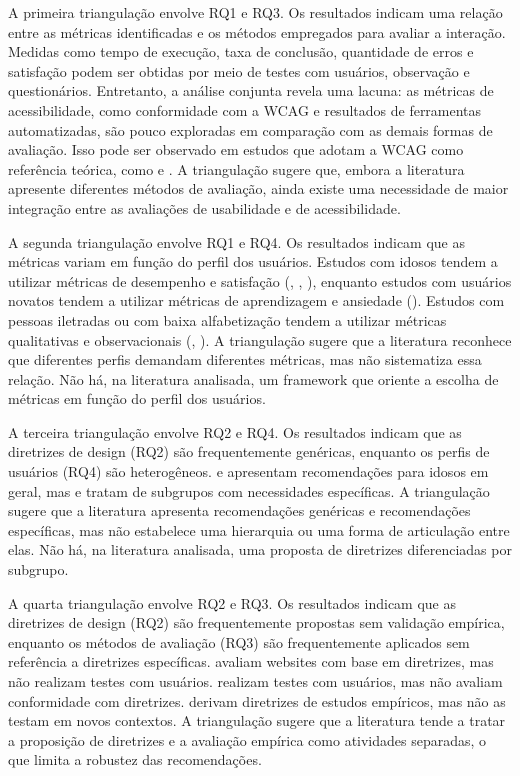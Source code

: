 A primeira triangulação envolve RQ1 e RQ3. Os resultados indicam uma relação entre as métricas identificadas e os métodos empregados para avaliar a interação. Medidas como tempo de execução, taxa de conclusão, quantidade de erros e satisfação podem ser obtidas por meio de testes com usuários, observação e questionários. Entretanto, a análise conjunta revela uma lacuna: as métricas de acessibilidade, como conformidade com a WCAG e resultados de ferramentas automatizadas, são pouco exploradas em comparação com as demais formas de avaliação. Isso pode ser observado em estudos que adotam a WCAG como referência teórica, como \cite{gonzalez2025augmenting} e \cite{wickramathilaka2023addressing}. A triangulação sugere que, embora a literatura apresente diferentes métodos de avaliação, ainda existe uma necessidade de maior integração entre as avaliações de usabilidade e de acessibilidade.

A segunda triangulação envolve RQ1 e RQ4. Os resultados indicam que as métricas variam em função do perfil dos usuários. Estudos com idosos tendem a utilizar métricas de desempenho e satisfação (\cite{weighted_heuristic}, \cite{gatsou2017seniors}, \cite{xie2010usability}), enquanto estudos com usuários novatos tendem a utilizar métricas de aprendizagem e ansiedade (\cite{cowan2011exploring}). Estudos com pessoas iletradas ou com baixa alfabetização tendem a utilizar métricas qualitativas e observacionais (\cite{filgueiras2009recoverability}, \cite{barron2013feasibility}). A triangulação sugere que a literatura reconhece que diferentes perfis demandam diferentes métricas, mas não sistematiza essa relação. Não há, na literatura analisada, um framework que oriente a escolha de métricas em função do perfil dos usuários.

A terceira triangulação envolve RQ2 e RQ4. Os resultados indicam que as diretrizes de design (RQ2) são frequentemente genéricas, enquanto os perfis de usuários (RQ4) são heterogêneos. \cite{kurniawan2005research} e \cite{sun2010preliminary} apresentam recomendações para idosos em geral, mas \cite{filgueiras2009recoverability} e \cite{gonzalez2025augmenting} tratam de subgrupos com necessidades específicas. A triangulação sugere que a literatura apresenta recomendações genéricas e recomendações específicas, mas não estabelece uma hierarquia ou uma forma de articulação entre elas. Não há, na literatura analisada, uma proposta de diretrizes diferenciadas por subgrupo.

A quarta triangulação envolve RQ2 e RQ3. Os resultados indicam que as diretrizes de design (RQ2) são frequentemente propostas sem validação empírica, enquanto os métodos de avaliação (RQ3) são frequentemente aplicados sem referência a diretrizes específicas. \cite{dombrovskaia2021guideline} avaliam websites com base em diretrizes, mas não realizam testes com usuários. \cite{gatsou2017seniors} realizam testes com usuários, mas não avaliam conformidade com diretrizes. \cite{kurniawan2005research} derivam diretrizes de estudos empíricos, mas não as testam em novos contextos. A triangulação sugere que a literatura tende a tratar a proposição de diretrizes e a avaliação empírica como atividades separadas, o que limita a robustez das recomendações.

